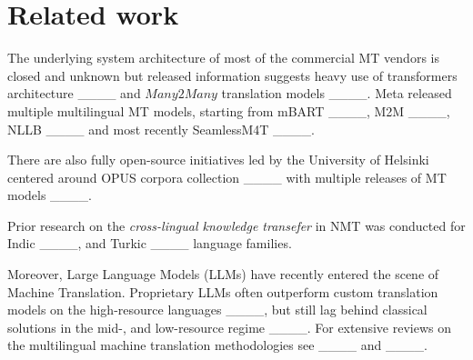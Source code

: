\section{Related work}
\label{sect:related_work}

The underlying system architecture of most of the commercial MT vendors is closed and unknown but released information suggests heavy use of transformers architecture ____ and $Many2Many$ translation models ____. Meta released multiple multilingual MT models, starting from mBART ____, M2M ____, NLLB ____ and most recently SeamlessM4T ____.

There are also fully open-source initiatives led by the University of Helsinki centered around OPUS corpora collection ____ with multiple releases of MT models ____.

Prior research on the \emph{cross-lingual knowledge transefer} in NMT was conducted for Indic ____, and Turkic ____ language families.

Moreover, Large Language Models (LLMs) have recently entered the scene of Machine Translation. Proprietary LLMs often outperform custom translation models on the high-resource languages ____, but still lag behind classical solutions in the mid-, and low-resource regime ____. For extensive reviews on the multilingual machine translation methodologies see ____ and ____.